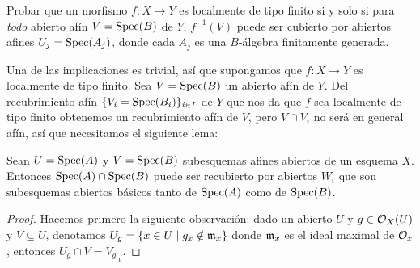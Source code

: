 \documentclass[twoside]{article}
\begin{document}
\begin{ejercicio}{3.1}
Probar que un morfismo $f:X\to Y$ es localmente de tipo finito si y solo si para \emph{todo} abierto afín $V=\operatorname{Spec}(B)$ de $Y$, $f^{-1}(V)$ puede ser cubierto por abiertos afines $U_j=\operatorname{Spec}(A_j)$, donde cada $A_j$ es una $B$-álgebra finitamente generada. 
\end{ejercicio}
\begin{solucion}
%

%
%
%
%

Una de las implicaciones es trivial, así que supongamos que $f:X\to Y$ es localmente de tipo finito. Sea $V=\operatorname{Spec}(B)$ un abierto afín de $Y$. Del recubrimiento afín $\{V_i=\operatorname{Spec}(B_i)\}_{i\in I}$ de $Y$ que nos da que $f$ sea localmente de tipo finito obtenemos un recubrimiento afín de $V$, pero $V\cap V_i$ no será en general afín, así que necesitamos el siguiente lema:

\begin{lemma}
Sean $U=\operatorname{Spec}(A)$ y $V=\operatorname{Spec}(B)$ subesquemas afines abiertos de un esquema $X$. Entonces $\operatorname{Spec}(A)\cap\operatorname{Spec}(B)$ puede ser recubierto por abiertos $W_i$ que son subesquemas abiertos básicos tanto de $\operatorname{Spec}(A)$ como de $\operatorname{Spec}(B)$.
\end{lemma}
\begin{proof}
Hacemos primero la siguiente observación: dado un abierto $U$ y $g\in{\mathcal O}_X(U)$ y $V\subseteq U$, denotamos $U_g=\{x\in U\mid g_x\notin \mathfrak{m}_x\}$ donde $\mathfrak{m}_x$ es el ideal maximal de ${\mathcal O}_x$, entonces $U_g\cap V=V_{g|_V}$. 


\end{proof}
\end{solucion}
\end{document}
